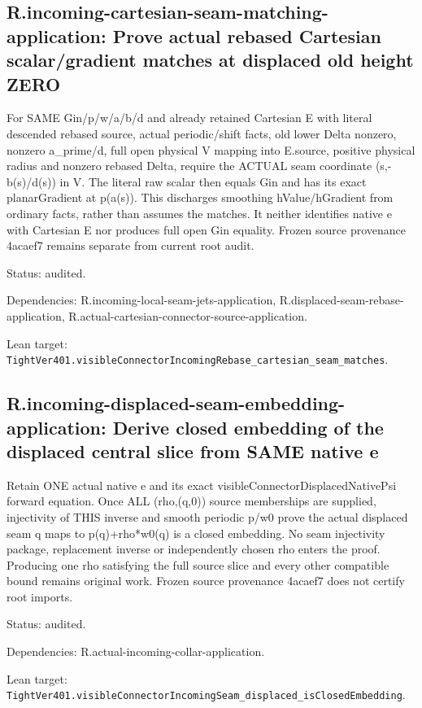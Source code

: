 \documentclass{article}
\begin{document}
\subsection*{R.incoming-cartesian-seam-matching-application: Prove actual rebased Cartesian scalar/gradient matches at displaced old height ZERO}
For SAME Gin/p/w/a/b/d and already retained Cartesian E with literal descended rebased source, actual periodic/shift facts, old lower Delta nonzero, nonzero a\_prime/d, full open physical V mapping into E.source, positive physical radius and nonzero rebased Delta, require the ACTUAL seam coordinate (s,-b(s)/d(s)) in V. The literal raw scalar then equals Gin and has its exact planarGradient at p(a(s)). This discharges smoothing hValue/hGradient from ordinary facts, rather than assumes the matches. It neither identifies native e with Cartesian E nor produces full open Gin equality. Frozen source provenance 4acaef7 remains separate from current root audit.
\par Status: audited.
\par Dependencies: R.incoming-local-seam-jets-application, R.displaced-seam-rebase-application, R.actual-cartesian-connector-source-application.
\par Lean target: \texttt{TightVer401.visibleConnectorIncomingRebase\_cartesian\_seam\_matches}.
\subsection*{R.incoming-displaced-seam-embedding-application: Derive closed embedding of the displaced central slice from SAME native e}
Retain ONE actual native e and its exact visibleConnectorDisplacedNativePsi forward equation. Once ALL (rho,(q,0)) source memberships are supplied, injectivity of THIS inverse and smooth periodic p/w0 prove the actual displaced seam q maps to p(q)+rho*w0(q) is a closed embedding. No seam injectivity package, replacement inverse or independently chosen rho enters the proof. Producing one rho satisfying the full source slice and every other compatible bound remains original work. Frozen source provenance 4acaef7 does not certify root imports.
\par Status: audited.
\par Dependencies: R.actual-incoming-collar-application.
\par Lean target: \texttt{TightVer401.visibleConnectorIncomingSeam\_displaced\_isClosedEmbedding}.
\end{document}
